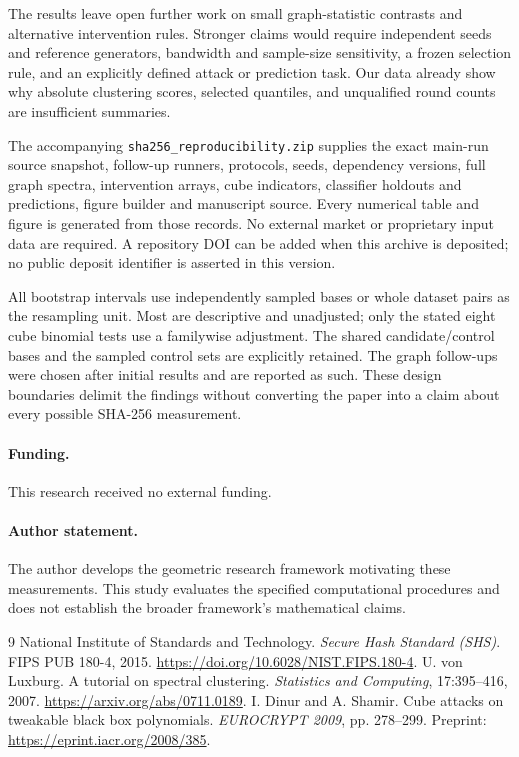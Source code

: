 \documentclass[11pt]{article}
\begin{document}
The results leave open further work on small graph-statistic contrasts and alternative intervention rules. Stronger claims would require independent seeds and reference generators, bandwidth and sample-size sensitivity, a frozen selection rule, and an explicitly defined attack or prediction task. Our data already show why absolute clustering scores, selected quantiles, and unqualified round counts are insufficient summaries.

The accompanying \texttt{sha256\_reproducibility.zip} supplies the exact main-run source snapshot, follow-up runners, protocols, seeds, dependency versions, full graph spectra, intervention arrays, cube indicators, classifier holdouts and predictions, figure builder and manuscript source. Every numerical table and figure is generated from those records. No external market or proprietary input data are required. A repository DOI can be added when this archive is deposited; no public deposit identifier is asserted in this version.

All bootstrap intervals use independently sampled bases or whole dataset pairs as the resampling unit. Most are descriptive and unadjusted; only the stated eight cube binomial tests use a familywise adjustment. The shared candidate/control bases and the sampled control sets are explicitly retained. The graph follow-ups were chosen after initial results and are reported as such. These design boundaries delimit the findings without converting the paper into a claim about every possible SHA-256 measurement.

\paragraph{Funding.} This research received no external funding.
\paragraph{Author statement.} The author develops the geometric research framework motivating these measurements. This study evaluates the specified computational procedures and does not establish the broader framework's mathematical claims.

\begin{thebibliography}{9}
 National Institute of Standards and Technology. \emph{Secure Hash Standard (SHS)}. FIPS PUB 180-4, 2015. \url{https://doi.org/10.6028/NIST.FIPS.180-4}.
 U. von Luxburg. A tutorial on spectral clustering. \emph{Statistics and Computing}, 17:395--416, 2007. \url{https://arxiv.org/abs/0711.0189}.
 I. Dinur and A. Shamir. Cube attacks on tweakable black box polynomials. \emph{EUROCRYPT 2009}, pp. 278--299. Preprint: \url{https://eprint.iacr.org/2008/385}.
\end{thebibliography}
\end{document}
